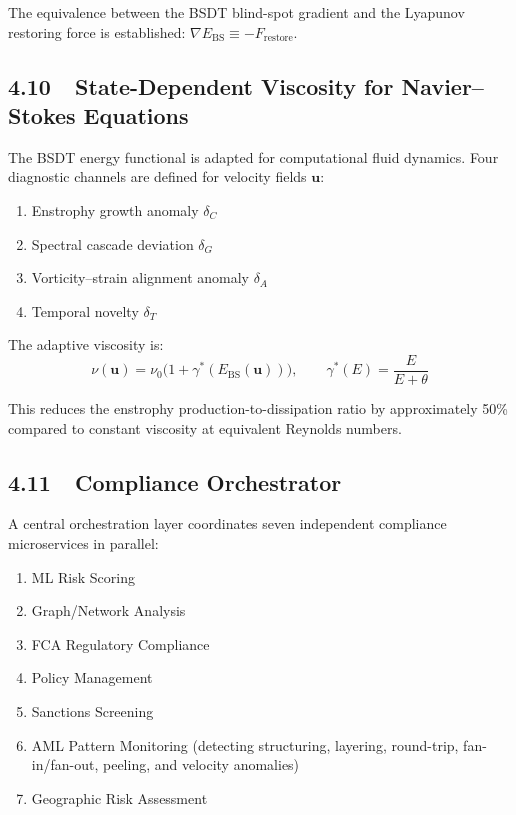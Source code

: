 \documentclass[12pt,a4paper]{article}
\begin{document}
The equivalence between the BSDT blind-spot gradient and the Lyapunov
restoring force is established:
$\nabla E_{\mathrm{BS}} \equiv -F_{\mathrm{restore}}$.

\subsection{4.10~~State-Dependent Viscosity for Navier--Stokes Equations}

The BSDT energy functional is adapted for computational fluid dynamics.  Four
diagnostic channels are defined for velocity fields $\mathbf{u}$:

\begin{enumerate}
\item Enstrophy growth anomaly $\delta_C$
\item Spectral cascade deviation $\delta_G$
\item Vorticity--strain alignment anomaly $\delta_A$
\item Temporal novelty $\delta_T$
\end{enumerate}

The adaptive viscosity is:
\[
  \nu(\mathbf{u}) = \nu_0 \bigl(1 + \gamma^*(E_{\mathrm{BS}}(\mathbf{u}))\bigr), \qquad
  \gamma^*(E) = \frac{E}{E + \theta}
\]

This reduces the enstrophy production-to-dissipation ratio by approximately
50\% compared to constant viscosity at equivalent Reynolds numbers.

\subsection{4.11~~Compliance Orchestrator}

A central orchestration layer coordinates seven independent compliance
microservices in parallel:

\begin{enumerate}
\item ML Risk Scoring
\item Graph/Network Analysis
\item FCA Regulatory Compliance
\item Policy Management
\item Sanctions Screening
\item AML Pattern Monitoring (detecting structuring, layering, round-trip,
  fan-in/fan-out, peeling, and velocity anomalies)
\item Geographic Risk Assessment
\end{enumerate}
\end{document}
